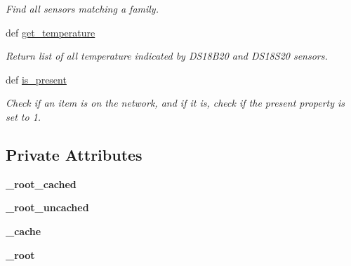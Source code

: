 \begin{CompactItemize}
\begin{CompactList}\small\item\em Find all sensors matching a family. \item\end{CompactList}\item 
def \hyperlink{classonewire_1_1OneWire_ece120e9964b38335bf23a7028d45083}{get\_\-temperature}
\begin{CompactList}\small\item\em Return list of all temperature indicated by DS18B20 and DS18S20 sensors. \item\end{CompactList}\item 
\hypertarget{classonewire_1_1OneWire_a39fa5e62e0d65e62a915eb334d54fed}{
def \hyperlink{classonewire_1_1OneWire_a39fa5e62e0d65e62a915eb334d54fed}{is\_\-present}}
\label{classonewire_1_1OneWire_a39fa5e62e0d65e62a915eb334d54fed}

\begin{CompactList}\small\item\em Check if an item is on the network, and if it is, check if the present property is set to 1. \item\end{CompactList}\end{CompactItemize}
\subsection*{Private Attributes}
\begin{CompactItemize}
\item 
\hypertarget{classonewire_1_1OneWire_40f37588fd8a7fb0ac894db039ce1957}{
\textbf{\_\-root\_\-cached}}
\label{classonewire_1_1OneWire_40f37588fd8a7fb0ac894db039ce1957}

\item 
\hypertarget{classonewire_1_1OneWire_e2458b6e1c97fa036e57367bacdfe2d5}{
\textbf{\_\-root\_\-uncached}}
\label{classonewire_1_1OneWire_e2458b6e1c97fa036e57367bacdfe2d5}

\item 
\hypertarget{classonewire_1_1OneWire_f75836fcd181ffa0e98c7d3e5b9c25af}{
\textbf{\_\-cache}}
\label{classonewire_1_1OneWire_f75836fcd181ffa0e98c7d3e5b9c25af}

\item 
\hypertarget{classonewire_1_1OneWire_1165b31792f0a8955d26b55d524f58bf}{
\textbf{\_\-root}}
\label{classonewire_1_1OneWire_1165b31792f0a8955d26b55d524f58bf}

\end{CompactItemize}


